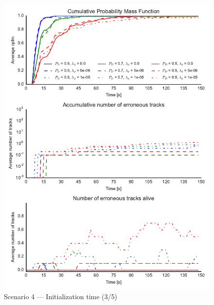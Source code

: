 \begin{figure}
\centering
\includegraphics{Figures/plots/Scenario4_Init-Time(3-5).pdf}
\caption{Scenario 4 --- Initialization time (3/5)}\label{fig:init4_time_3-5}
\end{figure}

